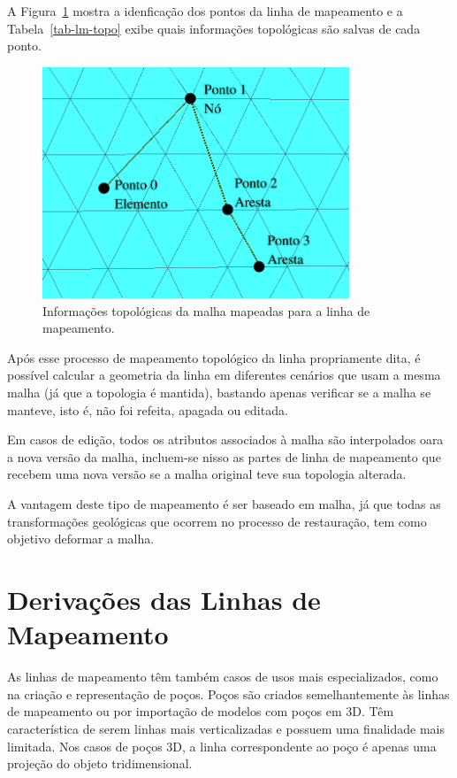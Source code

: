 A Figura~\ref{fig-lm-topo} mostra a idenficação dos pontos da linha de mapeamento e a Tabela~\ref{tab-lm-topo} exibe quais informações topológicas são salvas de cada ponto.

\begin{figure} [hbt!]
  \begin{center}
    \includegraphics[width=260pt]{images/fig-lm-topo}
    \caption{Informações topológicas da malha mapeadas para a linha de mapeamento.}\label{fig-lm-topo}
  \end{center}
\end{figure}



Após esse processo de mapeamento topológico da linha propriamente dita, é possível calcular a geometria da linha em diferentes cenários que usam a mesma malha (já que a topologia é mantida), bastando apenas verificar se a malha se manteve, isto é, não foi refeita, apagada ou editada.

Em casos de edição, todos os atributos associados à malha são interpolados oara a nova versão da malha, incluem-se nisso as partes de linha de mapeamento que recebem uma nova versão se a malha original teve sua topologia alterada.

A vantagem deste tipo de mapeamento é ser baseado em malha, já que todas as transformações geológicas que ocorrem no processo de restauração, tem como objetivo deformar a malha.

\section{Derivações das Linhas de Mapeamento}

As linhas de mapeamento têm também casos de usos mais especializados, como na criação e representação de poços. Poços são criados semelhantemente às linhas de mapeamento ou por importação de modelos com poços em 3D. Têm característica de serem linhas mais verticalizadas e possuem uma finalidade mais limitada. Nos casos de poços 3D, a linha correspondente ao poço é apenas uma projeção do objeto tridimensional.

